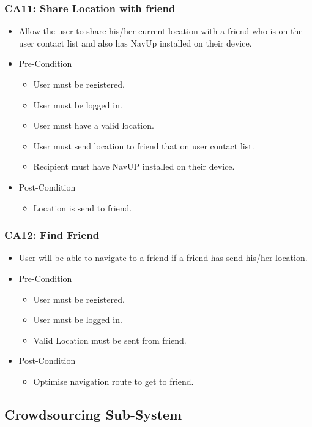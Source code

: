 \documentclass[12pt,a4paper]{article}
\begin{document}
		\subsubsection{CA11: Share Location with friend}
			\begin{itemize}
				\item Allow the user to share his/her current location with a friend who is on the user contact list and also has NavUp installed on their device.
				\item Pre-Condition
					\begin{itemize}
						\item User must be registered.
						\item User must be logged in.
						\item User must have a valid location.
						\item User must send location to friend that on user contact list.
						\item Recipient must have NavUP installed on their device.
					\end{itemize}
				\item Post-Condition
					\begin{itemize}
						\item Location is send to friend.
					\end{itemize}
			\end{itemize}
		\subsubsection{CA12: Find Friend}
			\begin{itemize}
				\item User will be able to navigate to a friend if a friend has send his/her location.
				\item Pre-Condition
					\begin{itemize}
						\item User must be registered.
						\item User must be logged in.
						\item Valid Location must be sent from friend.
					\end{itemize}
				\item Post-Condition
					\begin{itemize}
						\item Optimise navigation route to get to friend.
					\end{itemize}
			\end{itemize}
	\subsection{Crowdsourcing Sub-System}
\end{document}

